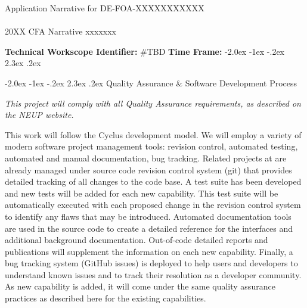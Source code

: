 \documentclass[dvips,11pt]{article}
\makeatletter
\renewcommand\section{\@startsection {section}{1}{\z@}%
                                   {-2.0ex \@plus -1ex \@minus -.2ex}%
                                   {2.3ex \@plus.2ex}%
                                   {\normalfont\bfseries}}%
\makeatother
\begin{document}
\begin{centering}
  Application Narrative for DE-FOA-XXXXXXXXXXX\\
  \textbf{\large }\\
  20XX CFA Narrative xxxxxxx\\
\end{centering}
\vspace{1em}

\noindent\textbf{Technical Workscope Identifier:} #TBD \hspace{1.5in}
\textbf{Time Frame:} 
\section{}

\section{Quality Assurance \& Software Development Process}

\textit{This project will comply with all Quality Assurance requirements, as
described on the NEUP website.}  

This work will follow the Cyclus development model.  We will employ a variety of
modern software project management tools: revision control, automated testing,
automated and manual documentation, bug tracking. Related projects at are
already managed under source code revision control system (git) that provides
detailed tracking of all changes to the code base. A test suite has been
developed and new tests will be added for each new capability. This test suite
will be automatically executed with each proposed change in the revision control
system to identify any flaws that may be introduced. Automated documentation
tools are used in the source code to create a detailed reference for the
interfaces and additional background documentation. Out-of-code detailed reports
and publications will supplement the information on each new capability.
Finally, a bug tracking system (GitHub issues) is deployed to help users and
developers to understand known issues and to track their resolution as a
developer community. As new capability is added, it will come under the same
quality assurance practices as described here for the existing capabilities.







\label{LastPage}
\end{document}
